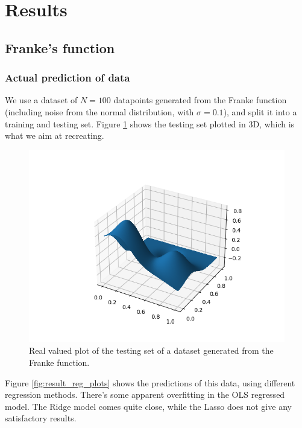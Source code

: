\documentclass[../main.tex]{subfiles}
\begin{document}
\section{Results}\label{sec:results}
\subsection{Franke's function}
\subsubsection{Actual prediction of data}
We use a dataset of $N=100$ datapoints generated from the Franke function (including noise from the normal distribution, with $\sigma=0.1$), and split it into a training and testing set. Figure \ref{fig:result_actual_plot} shows the testing set plotted in 3D, which is what we aim at recreating.

\begin{figure}[h]
    \centering
    \includegraphics[width=\textwidth]{../assets/actual_franke_plot.png}
    \caption{Real valued plot of the testing set of a dataset generated from the Franke function.}
    \label{fig:result_actual_plot}
\end{figure}

Figure \ref{fig:result_reg_plots} shows the predictions of this data, using different regression methods. There's some apparent overfitting in the OLS regressed model. The Ridge model comes quite close, while the Lasso does not give any satisfactory results. 
\end{document}
